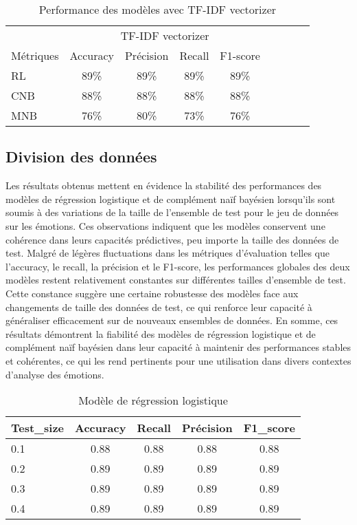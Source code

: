 \begin{table}[h!]
    \centering
    \caption{Performance des modèles avec TF-IDF vectorizer}
    \begin{tabular}{lcccccccc}
        \toprule
        & \multicolumn{4}{c}{TF-IDF vectorizer} \\
        \cmidrule(lr){2-5}
        Métriques & Accuracy & Précision & Recall & F1-score \\
        \midrule
        RL & 89\% & 89\% & 89\% & 89\% \\
        CNB & 88\% & 88\% & 88\% & 88\% \\
        MNB & 76\% & 80\% & 73\% & 76\% \\
        \bottomrule
    \end{tabular}
\end{table}
\newpage
\subsection{Division des données}
Les résultats obtenus mettent en évidence la stabilité des performances des modèles de régression logistique et de complément naïf bayésien lorsqu'ils sont soumis à des variations de la taille de l'ensemble de test pour le jeu de données sur les émotions. Ces observations indiquent que les modèles conservent une cohérence dans leurs capacités prédictives, peu importe la taille des données de test. Malgré de légères fluctuations dans les métriques d'évaluation telles que l'accuracy, le recall, la précision et le F1-score, les performances globales des deux modèles restent relativement constantes sur différentes tailles d'ensemble de test. Cette constance suggère une certaine robustesse des modèles face aux changements de taille des données de test, ce qui renforce leur capacité à généraliser efficacement sur de nouveaux ensembles de données. En somme, ces résultats démontrent la fiabilité des modèles de régression logistique et de complément naïf bayésien dans leur capacité à maintenir des performances stables et cohérentes, ce qui les rend pertinents pour une utilisation dans divers contextes d'analyse des émotions. 
\begin{table}[h!]
    \centering
    \caption{Modèle de régression logistique}
    \begin{tabular}{lcccc}
        \toprule
        Test\_size & Accuracy & Recall & Précision & F1\_score \\
        \midrule
        0.1 & 0.88 & 0.88 & 0.88 & 0.88 \\
        0.2 & 0.89 & 0.89 & 0.89 & 0.89 \\
        0.3 & 0.89 & 0.89 & 0.89 & 0.89 \\
        0.4 & 0.89 & 0.89 & 0.89 & 0.89 \\
        \bottomrule
    \end{tabular}
\end{table}

